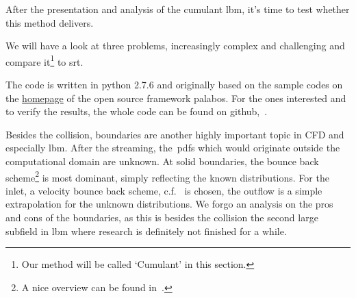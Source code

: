 After the presentation and analysis of the cumulant \gls{lbm}, it's time to test whether this method delivers.

We will have a look at three problems, increasingly complex and challenging and compare it\footnote{Our method will be called `Cumulant' in this section.} to \gls{srt}.

The code is written in python 2.7.6 and originally based on the sample codes on the \href{http://wiki.palabos.org/numerics:codes}{homepage} of the open source framework palabos.
For the ones interested and to verify the results, the whole code can be found on github,~\cite{gitrepo_MastersThesis}.

Besides the collision, boundaries are another highly important topic in CFD and especially \gls{lbm}.
After the streaming, the~\glspl{pdf} which would originate outside the computational domain are unknown.
At solid boundaries, the bounce back scheme\footnote{A nice overview can be found in~\cite{boundaries}.} is most dominant, simply reflecting the known distributions.
For the inlet, a velocity bounce back scheme, c.f.~\cite{yu2003viscous} is chosen, the outflow is a simple extrapolation for the unknown distributions.
We forgo an analysis on the pros and cons of the boundaries, as this is besides the collision the second large subfield in \gls{lbm} where research is definitely not finished for a while.
